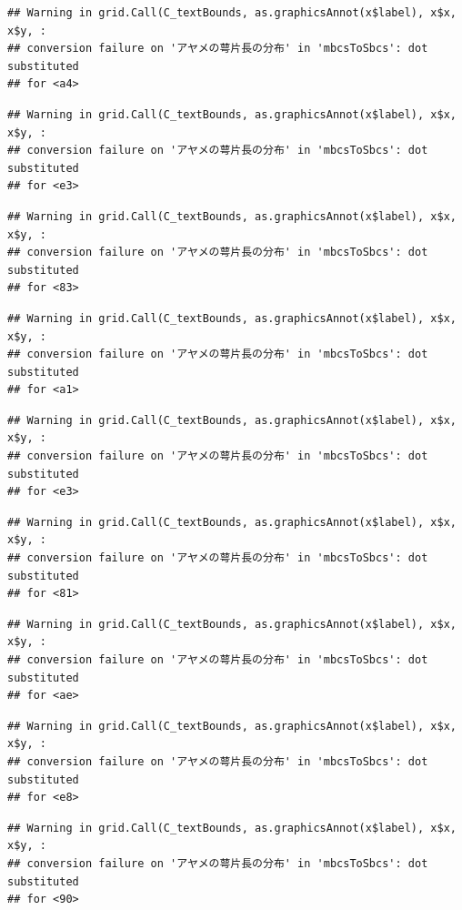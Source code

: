 \documentclass[
]{book}
\begin{document}
\begin{verbatim}
## Warning in grid.Call(C_textBounds, as.graphicsAnnot(x$label), x$x, x$y, :
## conversion failure on 'アヤメの萼片長の分布' in 'mbcsToSbcs': dot substituted
## for <a4>
\end{verbatim}

\begin{verbatim}
## Warning in grid.Call(C_textBounds, as.graphicsAnnot(x$label), x$x, x$y, :
## conversion failure on 'アヤメの萼片長の分布' in 'mbcsToSbcs': dot substituted
## for <e3>
\end{verbatim}

\begin{verbatim}
## Warning in grid.Call(C_textBounds, as.graphicsAnnot(x$label), x$x, x$y, :
## conversion failure on 'アヤメの萼片長の分布' in 'mbcsToSbcs': dot substituted
## for <83>
\end{verbatim}

\begin{verbatim}
## Warning in grid.Call(C_textBounds, as.graphicsAnnot(x$label), x$x, x$y, :
## conversion failure on 'アヤメの萼片長の分布' in 'mbcsToSbcs': dot substituted
## for <a1>
\end{verbatim}

\begin{verbatim}
## Warning in grid.Call(C_textBounds, as.graphicsAnnot(x$label), x$x, x$y, :
## conversion failure on 'アヤメの萼片長の分布' in 'mbcsToSbcs': dot substituted
## for <e3>
\end{verbatim}

\begin{verbatim}
## Warning in grid.Call(C_textBounds, as.graphicsAnnot(x$label), x$x, x$y, :
## conversion failure on 'アヤメの萼片長の分布' in 'mbcsToSbcs': dot substituted
## for <81>
\end{verbatim}

\begin{verbatim}
## Warning in grid.Call(C_textBounds, as.graphicsAnnot(x$label), x$x, x$y, :
## conversion failure on 'アヤメの萼片長の分布' in 'mbcsToSbcs': dot substituted
## for <ae>
\end{verbatim}

\begin{verbatim}
## Warning in grid.Call(C_textBounds, as.graphicsAnnot(x$label), x$x, x$y, :
## conversion failure on 'アヤメの萼片長の分布' in 'mbcsToSbcs': dot substituted
## for <e8>
\end{verbatim}

\begin{verbatim}
## Warning in grid.Call(C_textBounds, as.graphicsAnnot(x$label), x$x, x$y, :
## conversion failure on 'アヤメの萼片長の分布' in 'mbcsToSbcs': dot substituted
## for <90>
\end{verbatim}
\end{document}
